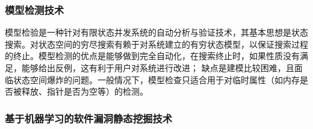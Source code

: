 \subsubsection{模型检测技术}

模型检验是一种针对有限状态并发系统的自动分析与验证技术，其基本思想是状态搜索。对状态空间的穷尽搜索有赖于对系统建立的有穷状态模型，以保证搜索过程的终止。模型检测的优点是能够做到完全自动化，在搜索终止时，如果性质没有满足，能够给出反例，这有利于用户对系统进行改进； 缺点是建模比较困难，且面临状态空间爆炸的问题。一般情况下，模型检查只适合用于对临时属性（如内存是否被释放、指针是否为空等）的检测。

%


\subsubsection{基于机器学习的软件漏洞静态挖掘技术}

